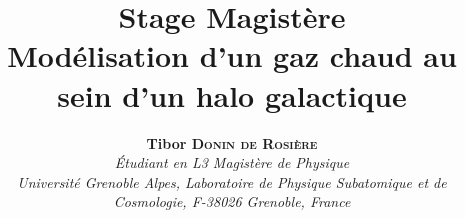 \documentclass[a4paper, french, twoside, twocolumn, 11 pt]{article}
\begin{document}
\newpage
\thispagestyle{1erepage}
\title{\textbf{Stage Magistère\\\LARGE Modélisation d'un gaz chaud au sein d'un halo galactique\\[0.5em]}}
\author{\normalsize\textbf{Tibor \textsc{Donin de Rosière}}\\\vspace{-0.5em}
    \footnotesize\emph{Étudiant en L3 Magistère de Physique}\\\vspace{-0.5em}
    \footnotesize\emph{Université Grenoble Alpes, Laboratoire de Physique Subatomique et de Cosmologie, F-38026 Grenoble, France}}
    \date{}

\twocolumn[{
\vspace{-3em}
\maketitle
\begin{abstract}
    \vspace{-1em}
            \emph
            {\lipsum[3]}
\end{abstract}
\vspace{3em}
}]
\thispagestyle{1erepage}
\end{document}
